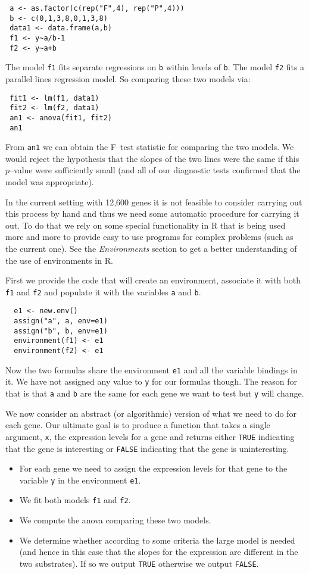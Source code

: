 \documentclass{article}
\begin{document}
\begin{verbatim}
 a <- as.factor(c(rep("F",4), rep("P",4)))
 b <- c(0,1,3,8,0,1,3,8)
 data1 <- data.frame(a,b)
 f1 <- y~a/b-1
 f2 <- y~a+b
\end{verbatim}

The model \verb+f1+ fits separate regressions on \verb+b+ within
levels of \verb+b+.
The model \verb+f2+ fits a parallel lines regression model. So
comparing these two models via: 
\begin{verbatim}
 fit1 <- lm(f1, data1)
 fit2 <- lm(f2, data1)
 an1 <- anova(fit1, fit2)
 an1 
\end{verbatim}
From \verb+an1+ we can obtain the F--test statistic for comparing the
two models. We would reject the hypothesis that the slopes of the two
lines were the same if this $p$--value were sufficiently small (and
all of our diagnostic tests confirmed that the model was appropriate).

In the current setting with 12,600 genes it is not feasible to
consider carrying out this process by hand and thus we need some
automatic procedure for carrying it out.
To do that we rely on some special functionality in R that is being
used more and more to provide easy to use programs for complex
problems (such as the current one).
See the {\em Environments} section to get a better understanding of
the use of environments in R.

First we provide the code that will create an environment, associate
it with both \verb+f1+ and \verb+f2+ and populate it with the
variables \verb+a+ and \verb+b+.

\begin{verbatim}
  e1 <- new.env()
  assign("a", a, env=e1)
  assign("b", b, env=e1)
  environment(f1) <- e1
  environment(f2) <- e1
\end{verbatim}
Now the two formulas share the environment \verb+e1+ and all the
variable bindings in it.
We have not assigned any value to \verb+y+ for our formulas though.
The reason for that is that \verb+a+ and \verb+b+ are the same for
each gene we want to test but \verb+y+ will change.

We now consider an abstract (or algorithmic) version of what we need
to do for each gene.
Our ultimate goal is to produce a function that takes a single
argument, \verb+x+, the expression levels for a gene and returns
either \verb+TRUE+ indicating that the gene is interesting or
\verb+FALSE+ indicating that the gene is uninteresting.

\begin{itemize}
\item For each gene we need to assign the expression levels for that
  gene to the variable \verb+y+ in the environment \verb+e1+.
\item We fit both models \verb+f1+ and \verb+f2+.
\item We compute the anova comparing these two models.
\item We determine whether according to some criteria the large model
  is needed (and hence in this case that the slopes for the expression
  are different in the two substrates). If so we output \verb+TRUE+
  otherwise we output \verb+FALSE+.
\end{itemize}
\end{document}
